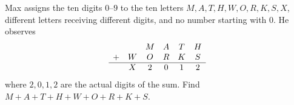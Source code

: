 Max assigns the ten digits $0$--$9$ to the ten letters $M,A,T,H,W,O,R,K,S,X$, different letters receiving different digits, and no number starting with $0$. He observes
\[\begin{array}{cccccc}&&M&A&T&H\\+&W&O&R&K&S\\\hline &X&2&0&1&2\end{array}\]
where $2,0,1,2$ are the actual digits of the sum. Find $M+A+T+H+W+O+R+K+S$.
